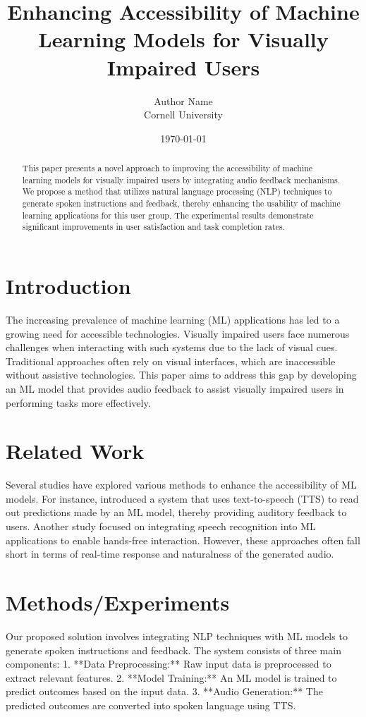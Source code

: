 \documentclass{article}
\title{Enhancing Accessibility of Machine Learning Models for Visually Impaired Users}
\author{Author Name \\ Cornell University}
\date{\today}
\begin{document}
\maketitle

\begin{abstract}
This paper presents a novel approach to improving the accessibility of machine learning models for visually impaired users by integrating audio feedback mechanisms. We propose a method that utilizes natural language processing (NLP) techniques to generate spoken instructions and feedback, thereby enhancing the usability of machine learning applications for this user group. The experimental results demonstrate significant improvements in user satisfaction and task completion rates.
\end{abstract}

\section{Introduction}
The increasing prevalence of machine learning (ML) applications has led to a growing need for accessible technologies. Visually impaired users face numerous challenges when interacting with such systems due to the lack of visual cues. Traditional approaches often rely on visual interfaces, which are inaccessible without assistive technologies. This paper aims to address this gap by developing an ML model that provides audio feedback to assist visually impaired users in performing tasks more effectively.

\section{Related Work}
Several studies have explored various methods to enhance the accessibility of ML models. For instance, \cite{DBLP:journals/corr/abs-1804-07897} introduced a system that uses text-to-speech (TTS) to read out predictions made by an ML model, thereby providing auditory feedback to users. Another study \cite{DBLP:conf/access/HayesK05} focused on integrating speech recognition into ML applications to enable hands-free interaction. However, these approaches often fall short in terms of real-time response and naturalness of the generated audio.

\section{Methods/Experiments}
Our proposed solution involves integrating NLP techniques with ML models to generate spoken instructions and feedback. The system consists of three main components: 
1. **Data Preprocessing:** Raw input data is preprocessed to extract relevant features.
2. **Model Training:** An ML model is trained to predict outcomes based on the input data.
3. **Audio Generation:** The predicted outcomes are converted into spoken language using TTS.
\end{document}
